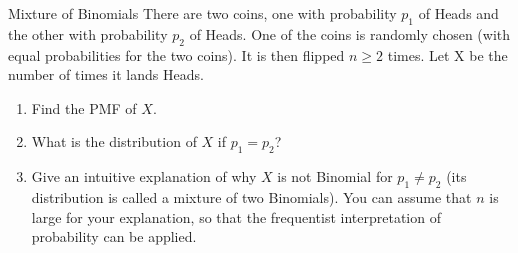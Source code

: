 \documentclass[11pt]{article}
\begin{document}
\begin{comment}
\item 
We can compute the PMF of $X + Y$ using the Law of Total Probability. \\
We want $P(X + Y = k)$. Condition on the value of $X$.
\begin{align*}
P(X + Y = k) &= \sum_{j = 0}^k P(X + Y = k | X = j)P(X = j) \\
&= \sum_{j = 0}^k P(Y = k - j| X = j)P(X = j) \\
&= \sum_{j = 0}^k P(Y = k - j)P(X = j) \; \textrm{(we're using the independence assumption here!)} \\
&= \sum_{j = 0}^k \binom{n_2}{k - j}p^{k - j}(1 - p)^{n_2 - (k - j)} \binom{n_1}{j}p^j(1 - p)^{n_1 - j} \\
&= \paren{\sum_{j = 0}^k\binom{n_2}{k - j}\binom{n_1}{j}} p^k(1 - p)^{n_1 + n_2 - k}  \\
&= \binom{n_1 + n_2}{k} p^k(1 - p)^{n_1 + n_2 - k}
\end{align*}
The last step uses Vandermonde's identity. We recognize that this as this $\Bin(n_1 + n_2, p)$ PMF. Compare this to the story proof, which is way better!
\item Using the result in part a that $X + Y \sim \Bin(n_1 + n_2, p)$, we have that
\begin{align*}
P(X + Y = 10) = \binom{n_1 + n_2}{10} p^{10} (1 - p)^{n_1 + n_2 - 10}
\end{align*} 

If $n_1 + n_2 < 10$, then the answer is 0 because if we're not even flipping coins at least 10 times, then we can't get 10 heads. 
\item $X - Y$ can go negative, and hence cannot be Binomial as the support of the Binomial distribution are non-negative integers.
\end{enumerate}

\end{solution}
\end{comment}

\begin{exercise}{Mixture of Binomials}
There are two coins, one with probability $p_1$ of Heads and the other with probability $p_2$ of Heads. One of the coins is randomly chosen (with equal probabilities for the two coins). It is then flipped $n \geq 2$ times. Let X be the number of times it lands Heads.
\begin{enumerate}
\item 
Find the PMF of $X$. 
\item What is the distribution of $X$ if $p_1 = p_2$? 


\item Give an intuitive explanation of why $X$ is not Binomial for $p_1 \neq p_2$ (its distribution is called a mixture of two Binomials). You can assume that $n$ is large for your explanation, so that the frequentist interpretation of probability can be applied.
\end{enumerate}
\end{exercise}
\end{document}
